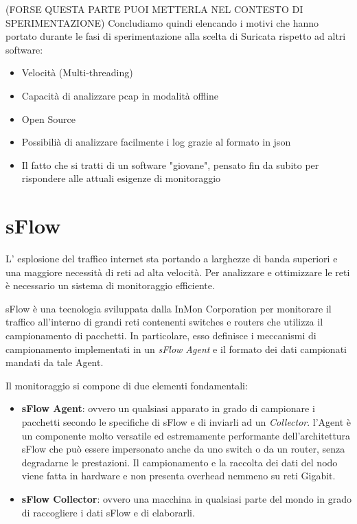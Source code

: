 \documentclass[12pt,a4paper,openright,twoside]{report}
\begin{document}
(FORSE QUESTA PARTE PUOI METTERLA NEL CONTESTO DI SPERIMENTAZIONE)
Concludiamo quindi elencando i motivi che hanno portato durante le fasi di sperimentazione
alla scelta di Suricata rispetto ad altri software:
\begin{itemize}
  \item Velocit\`a (Multi-threading)
  \item Capacit\`a di analizzare pcap in modalit\`a offline
  \item Open Source
  \item Possibili\`a di analizzare facilmente i log grazie al formato in json
  \item Il fatto che si tratti di un software "giovane", pensato fin da
  subito per rispondere alle attuali esigenze di monitoraggio
\end{itemize}

\newpage


\section{sFlow}

L' esplosione del traffico internet sta portando a larghezze di banda superiori
e una maggiore necessit\`a di reti ad alta velocit\`a. Per analizzare e ottimizzare
le reti \`e necessario un sistema di monitoraggio efficiente. \cite{S1}

sFlow \cite{K1} \`e una tecnologia sviluppata dalla InMon Corporation per monitorare il traffico all'interno
di grandi reti contenenti
switches e routers che utilizza il campionamento di pacchetti. In particolare, esso
definisce i meccanismi di campionamento implementati
in un \emph{sFlow Agent} e il formato dei dati campionati mandati da tale Agent.

Il monitoraggio si compone di due elementi fondamentali:
\begin{itemize}
  \item {\bf sFlow Agent}: ovvero un qualsiasi apparato in grado di campionare
  i pacchetti secondo le specifiche di sFlow e di inviarli ad un {\it Collector}.
  l'Agent \`e un componente molto versatile ed estremamente performante dell'architettura
  sFlow che pu\`o essere impersonato anche da uno switch o da un router, senza degradarne
  le prestazioni.
  Il campionamento e la raccolta dei dati del nodo viene fatta in hardware e non presenta
  overhead nemmeno su reti Gigabit.
  \item {\bf sFlow Collector}: ovvero una macchina in qualsiasi parte del mondo in grado di raccogliere
  i dati sFlow e di elaborarli.
\end{itemize}
\end{document}
